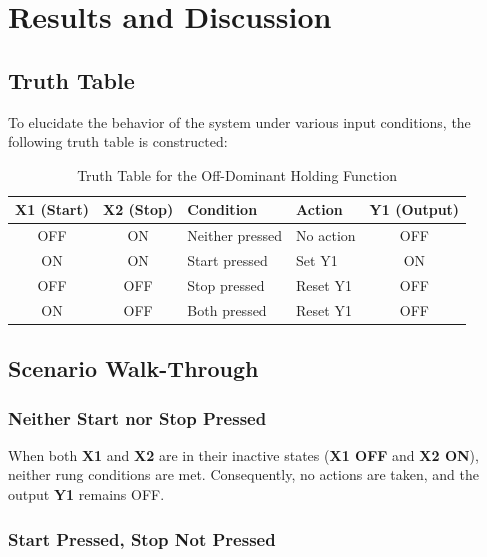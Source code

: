 \documentclass[12pt]{article}
\begin{document}
\section{Results and Discussion}

\subsection{Truth Table}

To elucidate the behavior of the system under various input conditions, the following truth table is constructed:

\begin{table}[h!]
\centering
\begin{tabular}{|c|c|l|l|c|}
\hline
\textbf{X1 (Start)} & \textbf{X2 (Stop)} & \textbf{Condition} & \textbf{Action} & \textbf{Y1 (Output)} \\ \hline
OFF                 & ON                 & Neither pressed    & No action       & OFF                  \\ \hline
ON                  & ON                 & Start pressed      & Set Y1          & ON                   \\ \hline
OFF                 & OFF                & Stop pressed       & Reset Y1        & OFF                  \\ \hline
ON                  & OFF                & Both pressed       & Reset Y1        & OFF                  \\ \hline
\end{tabular}
\caption{Truth Table for the Off-Dominant Holding Function}
\end{table}

\subsection{Scenario Walk-Through}

\subsubsection{Neither Start nor Stop Pressed}

When both \textbf{X1} and \textbf{X2} are in their inactive states (\textbf{X1 OFF} and \textbf{X2 ON}), neither rung conditions are met. Consequently, no actions are taken, and the output \textbf{Y1} remains OFF.

\subsubsection{Start Pressed, Stop Not Pressed}
\end{document}
